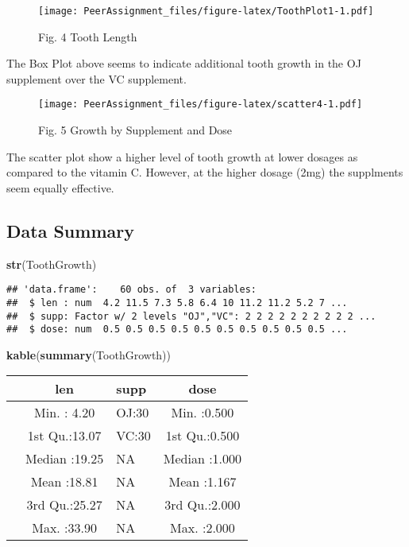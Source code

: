 \documentclass[]{article}
\newenvironment{Shaded}{\begin{snugshade}}{\end{snugshade}}
\newcommand{\KeywordTok}[1]{\textcolor[rgb]{0.13,0.29,0.53}{\textbf{#1}}}
\newcommand{\NormalTok}[1]{#1}
\begin{document}
\begin{figure}
\centering
\texttt{[image: PeerAssignment\_files/figure-latex/ToothPlot1-1.pdf]}
\caption{Fig. 4 Tooth Length}
\end{figure}

The Box Plot above seems to indicate additional tooth growth in the OJ
supplement over the VC supplement.

\begin{figure}
\centering
\texttt{[image: PeerAssignment\_files/figure-latex/scatter4-1.pdf]}
\caption{Fig. 5 Growth by Supplement and Dose}
\end{figure}

The scatter plot show a higher level of tooth growth at lower dosages as
compared to the vitamin C. However, at the higher dosage (2mg) the
supplments seem equally effective.

\hypertarget{data-summary}{%
\subsection{Data Summary}\label{data-summary}}

\begin{Shaded}
\begin{Highlighting}[]
\KeywordTok{str}\NormalTok{(ToothGrowth)}
\end{Highlighting}
\end{Shaded}

\begin{verbatim}
## 'data.frame':    60 obs. of  3 variables:
##  $ len : num  4.2 11.5 7.3 5.8 6.4 10 11.2 11.2 5.2 7 ...
##  $ supp: Factor w/ 2 levels "OJ","VC": 2 2 2 2 2 2 2 2 2 2 ...
##  $ dose: num  0.5 0.5 0.5 0.5 0.5 0.5 0.5 0.5 0.5 0.5 ...
\end{verbatim}

\begin{Shaded}
\begin{Highlighting}[]
\KeywordTok{kable}\NormalTok{(}\KeywordTok{summary}\NormalTok{(ToothGrowth))}
\end{Highlighting}
\end{Shaded}

\begin{longtable}[]{@{}lclc@{}}
\toprule
& len & supp & dose\tabularnewline
\midrule
\endhead
& Min. : 4.20 & OJ:30 & Min. :0.500\tabularnewline
& 1st Qu.:13.07 & VC:30 & 1st Qu.:0.500\tabularnewline
& Median :19.25 & NA & Median :1.000\tabularnewline
& Mean :18.81 & NA & Mean :1.167\tabularnewline
& 3rd Qu.:25.27 & NA & 3rd Qu.:2.000\tabularnewline
& Max. :33.90 & NA & Max. :2.000\tabularnewline
\bottomrule
\end{longtable}
\end{document}

